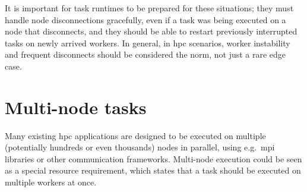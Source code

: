 It is important for task runtimes to be prepared for these situations; they must handle node
disconnections gracefully, even if a task was being executed on a node that disconnects, and they
should be able to restart previously interrupted tasks on newly arrived workers. In general, in
\gls{hpc} scenarios, worker instability and frequent disconnects should be
considered the norm, not just a rare edge case.

\section{Multi-node tasks}
Many existing \gls{hpc} applications are designed to be executed on multiple
(potentially hundreds or even thousands) nodes in parallel, using e.g.\ \gls{mpi}
libraries or other communication frameworks. Multi-node execution could be seen as a special
resource requirement, which states that a task should be executed on multiple workers at once.

